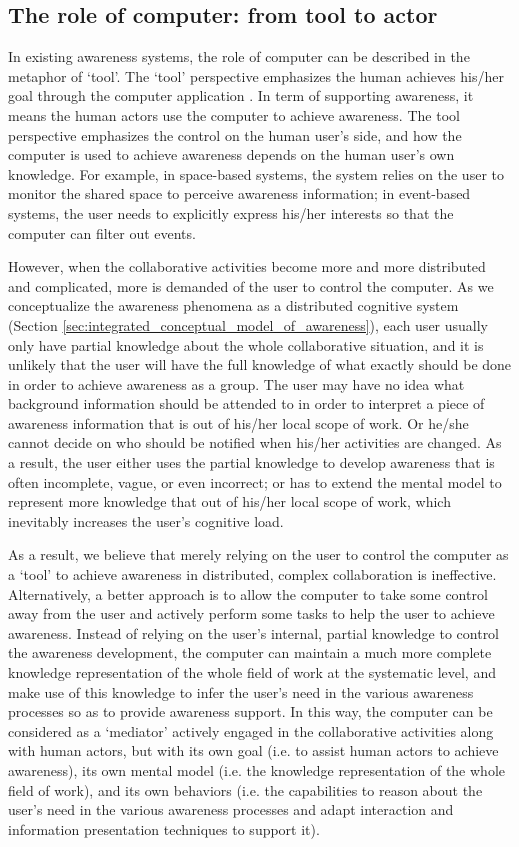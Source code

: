 \subsection{The role of computer: from tool to actor} %
\label{sub:the_role_of_computer}
In existing awareness systems, the role of computer can be described in the metaphor of `tool'. The `tool' perspective emphasizes the human achieves his/her goal through the computer application \cite{Bodker1997}. In term of supporting awareness, it means the human actors use the computer to achieve awareness. The tool perspective emphasizes the control on the human user's side, and how the computer is used to achieve awareness depends on the human user's own knowledge. For example, in space-based systems, the system relies on the user to monitor the shared space to perceive awareness information; in event-based systems, the user needs to explicitly express his/her interests so that the computer can filter out events. 

However, when the collaborative activities become more and more distributed and complicated, more is demanded of the user to control the computer. As we conceptualize the awareness phenomena as a distributed cognitive system (Section \ref{sec:integrated_conceptual_model_of_awareness}), each user usually only have partial knowledge about the whole collaborative situation, and it is unlikely that the user will have the full knowledge of what exactly should be done in order to achieve awareness as a group. The user may have no idea what background information should be attended to in order to interpret a piece of awareness information that is out of his/her local scope of work. Or he/she cannot decide on who should be notified when his/her activities are changed. As a result, the user either uses the partial knowledge to develop awareness that is often incomplete, vague, or even incorrect; or has to extend the mental model to represent more knowledge that out of his/her local scope of work, which inevitably increases the user's cognitive load. 

As a result, we believe that merely relying on the user to control the computer as a `tool' to achieve awareness in distributed, complex collaboration is ineffective. Alternatively, a better approach is to allow the computer to take some control away from the user and actively perform some tasks to help the user to achieve awareness. Instead of relying on the user's internal, partial knowledge to control the awareness development, the computer can maintain a much more complete knowledge representation of the whole field of work at the systematic level, and make use of this knowledge to infer the user's need in the various awareness processes so as to provide awareness support. In this way, the computer can be considered as a `mediator' actively engaged in the collaborative activities along with human actors, but with its own goal (i.e. to assist human actors to achieve awareness), its own mental model (i.e. the knowledge representation of the whole field of work), and its own behaviors (i.e. the capabilities to reason about the user's need in the various awareness processes and adapt interaction and information presentation techniques to support it).

